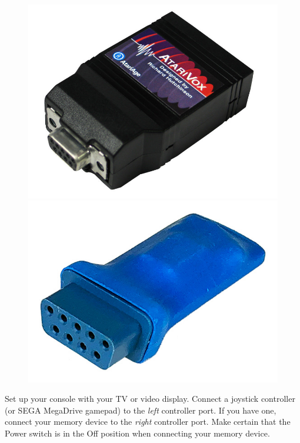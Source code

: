 \documentclass[10pt,twocolumn,openany,article]{memoir}
\begin{document}
\begin{figure}[b]
  \begin{center}
    \includegraphics[width=\columnwidth]{../Manual/AtariVox.jpeg}
    \includegraphics[width=\columnwidth]{../Manual/SaveKey.jpeg}
  \end{center}
\end{figure}

Set up  your console with your  TV or video display.  Connect a joystick
controller  (or SEGA  \ifdefined{}\fi{}MegaDrive gamepad)
to  the \emph{left}  controller  port\ifdefined\PLUSCART\else{}. If  you
have  one, connect  your memory  device to  the \emph{right}  controller
port. Make  certain that the  Power switch is  in the Off  position when
connecting your memory device\fi{}.
\end{document}
